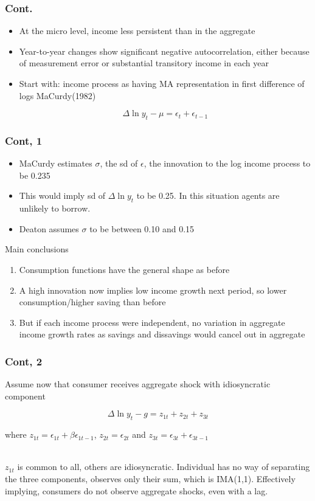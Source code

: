 \documentclass[mathserif]{beamer}
\begin{document}
\begin{frame}
\frametitle{Cont.}
\begin{itemize}
  \item At the micro level, income less persistent than in the aggregate
  \item Year-to-year changes show significant negative autocorrelation, either because of measurement error or substantial transitory income in each year
  \item Start with: income process as having MA representation in first difference of logs MaCurdy(1982)
  
  \begin{equation*}
    \Delta \ln y_{t} - \mu = \epsilon_{t} + \epsilon_{t - 1}
  \end{equation*}
\end{itemize}
\end{frame}

\begin{frame}
\frametitle{Cont, 1}
\begin{itemize}
  \item MaCurdy estimates $\sigma$, the sd of $\epsilon$, the innovation to the log income process to be 0.235
  \item This would imply sd of $\Delta \ln y_{t}$ to be 0.25. In this situation agents are unlikely to borrow.
  \item Deaton assumes $\sigma$ to be between 0.10 and 0.15
\end{itemize}

Main conclusions
\begin{enumerate}
  \item Consumption functions have the general shape as before
  \item A high innovation now implies low income growth next period, so lower consumption/higher saving than before
  \item But if each income process were independent, no variation in aggregate income growth rates as savings and dissavings would cancel out in aggregate
\end{enumerate}
\end{frame}

\begin{frame}
\frametitle{Cont, 2}
Assume now that consumer receives aggregate shock with idiosyncratic component
   
  \begin{equation*}
    \Delta \ln y_{t} - g = z_{1t} + z_{2t} + z_{3t}
  \end{equation*}

where \( z_{1t} = \epsilon_{1t} + \beta \epsilon_{1t - 1}\), \( z_{2t} = \epsilon_{2t} \) and \( z_{3t} = \epsilon_{3t} +  \epsilon_{3t - 1}\) \\\

\( z_{1t}\) is common to all, others are idiosyncratic. Individual has no way of separating the three components, observes only their sum, which is IMA(1,1). Effectively implying, consumers do not observe aggregate shocks, even with a lag.
\end{frame}
\end{document}
